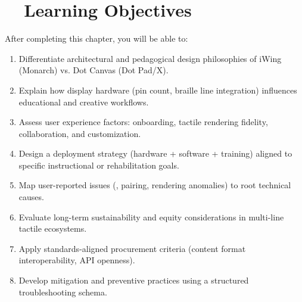 \section{~~Learning Objectives}
\label{sec:sr29-learning-objectives}
After completing this chapter, you will be able to:
\begin{enumerate}
	\item Differentiate architectural and pedagogical design philosophies of iWing (Monarch) vs. Dot Canvas (Dot Pad/X).
	\item Explain how display hardware (pin count, braille line integration) influences educational and creative workflows.
	\item Assess user experience factors: onboarding, tactile rendering fidelity, collaboration, and customization.
	\item Design a deployment strategy (hardware + software + training) aligned to specific instructional or rehabilitation goals.
	\item Map user-reported issues (, pairing, rendering anomalies) to root technical causes.
	\item Evaluate long-term sustainability and equity considerations in multi-line tactile ecosystems.
	\item Apply standards-aligned procurement criteria (content format interoperability, API openness).
	\item Develop mitigation and preventive practices using a structured troubleshooting schema.
\end{enumerate}

